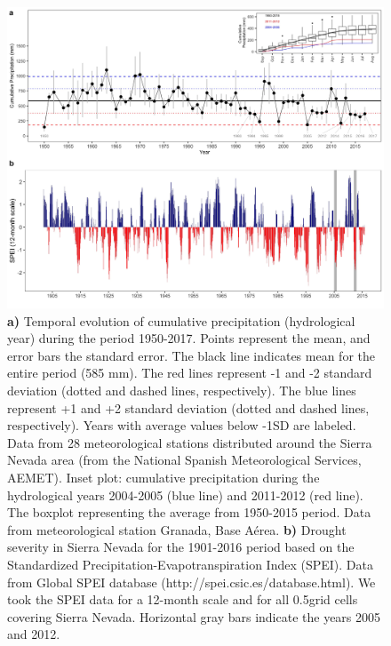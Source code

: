 \begin{figure}
\centering
\includegraphics[width=\textwidth]{img/dendro/dendro-s1climate} 
\caption{\textbf{a)} Temporal evolution of cumulative precipitation (hydrological year) during the period 1950-2017. Points represent the mean, and error bars the standard error. The black line indicates mean for the entire period (585 mm). The red lines represent -1 and -2 standard deviation (dotted and dashed lines, respectively). The blue lines represent +1 and +2 standard deviation (dotted and dashed lines, respectively). Years with average values below -1SD are labeled. Data from 28 meteorological stations distributed around the Sierra Nevada area (from the National Spanish Meteorological Services, AEMET). Inset plot: cumulative precipitation during the hydrological years 2004-2005 (blue line) and 2011-2012 (red line). The boxplot representing the average from 1950-2015 period. Data from meteorological station Granada, Base Aérea. \textbf{b)} Drought severity in Sierra Nevada for the 1901-2016 period based on the Standardized Precipitation-Evapotranspiration Index (SPEI). Data from Global SPEI database (http://spei.csic.es/database.html). We took the SPEI data for a 12-month scale and for all 0.5\textdegree grid cells covering Sierra Nevada. Horizontal gray bars indicate the years 2005 and 2012.}  
\label{fig:dendro:s1climate}
\end{figure}
\newpage


